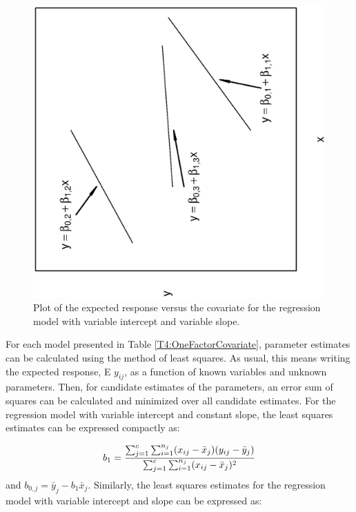 \begin{figure}[htp]
  \begin{center}
    \includegraphics[width=1\textwidth,angle=270,scale=0.5]{Chapter4/F4TheoryVarIntVarSlope.ps}
    \caption{\label{F4:TheoryVarIntVarSlope} \small  Plot of the expected response versus the covariate for the regression model
with variable intercept and variable slope.}
  \end{center}
\end{figure}

For each model presented in Table \ref{T4:OneFactorCovariate},
parameter estimates can be calculated using the method of least
squares. As usual, this means writing the expected response, E
$y_{ij}$, as a function of known variables and unknown parameters.
Then, for candidate estimates of the parameters, an error sum of
squares can be calculated and minimized over all candidate
estimates. For the regression model with variable intercept and
constant slope, the least squares estimates can be expressed
compactly as:

\begin{equation*}
b_1=\frac{\sum_{j=1}^{c}\sum_{i=1}^{n_j}(x_{ij}-\bar{x}_j)(y_{ij}-\bar{%
y}_j)}{\sum_{j=1}^{c}\sum_{i=1}^{n_j}(x_{ij}-\bar{x}_j)^2}
\end{equation*}
and $b_{0,j}=\bar{y}_j-b_1\bar{x}_j$. Similarly, the least
squares estimates for the regression model with variable intercept
and slope can be expressed as:

